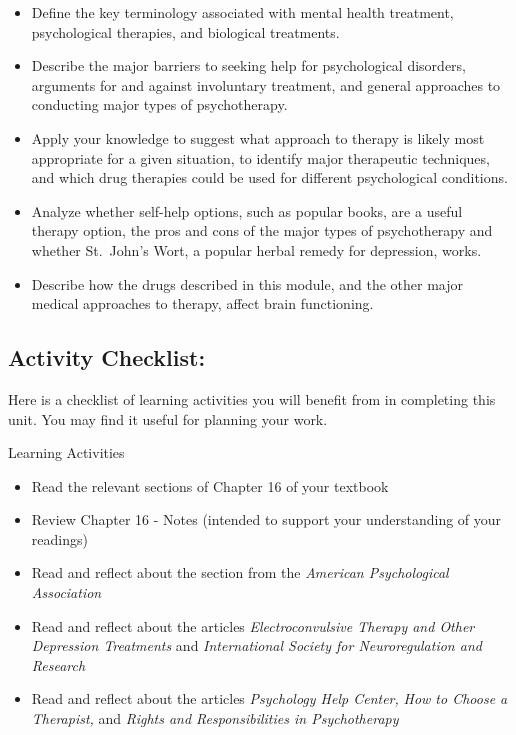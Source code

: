 \documentclass[
]{book}
\providecommand{\tightlist}{%
  \setlength{\itemsep}{0pt}\setlength{\parskip}{0pt}}
\begin{document}
\begin{itemize}
\tightlist
\item
  Define the key terminology associated with mental health treatment, psychological therapies, and biological treatments.\\
\item
  Describe the major barriers to seeking help for psychological disorders, arguments for and against involuntary treatment, and general approaches to conducting major types of psychotherapy.\\
\item
  Apply your knowledge to suggest what approach to therapy is likely most appropriate for a given situation, to identify major therapeutic techniques, and which drug therapies could be used for different psychological conditions.\\
\item
  Analyze whether self-help options, such as popular books, are a useful therapy option, the pros and cons of the major types of psychotherapy and whether St.~John's Wort, a popular herbal remedy for depression, works.\\
\item
  Describe how the drugs described in this module, and the other major medical approaches to therapy, affect brain functioning.
\end{itemize}

\hypertarget{activity-checklist-11}{%
\subsection*{Activity Checklist:}\label{activity-checklist-11}}

Here is a checklist of learning activities you will benefit from in completing this unit. You may find it useful for planning your work.

\begin{reflect}
{Learning Activities}

\begin{itemize}
\tightlist
\item
  Read the relevant sections of Chapter 16 of your textbook
\item
  Review Chapter 16 - Notes (intended to support your understanding of your readings)
\item
  Read and reflect about the section from the \emph{American Psychological Association}
\item
  Read and reflect about the articles \emph{Electroconvulsive Therapy and Other Depression Treatments} and \emph{International Society for Neuroregulation and Research}
\item
  Read and reflect about the articles \emph{Psychology Help Center,} \emph{How to Choose a Therapist,} and \emph{Rights and Responsibilities in Psychotherapy}
\end{itemize}
\end{reflect}
\end{document}
